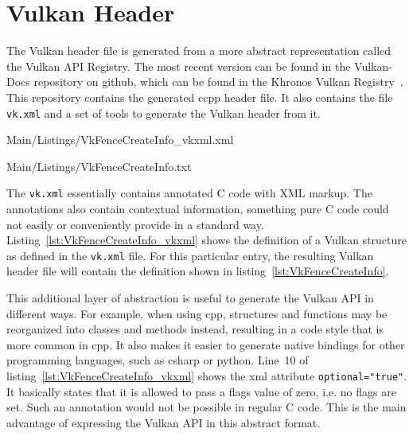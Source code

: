   \section{Vulkan Header}
  \label{sec:VulkanHeader}
    The Vulkan header file is generated from a more abstract representation called the Vulkan API Registry.
    The most recent version can be found in the Vulkan-Docs repository on \gls{github}, which can be found in the Khronos Vulkan Registry~\cite{vulkanregistry}.
    This repository contains the generated \gls{ccpp} header file.
    It also contains the file \lstinline{vk.xml} and a set of tools to generate the Vulkan header from it.

    
    {Main/Listings/VkFenceCreateInfo_vkxml.xml}
    
    {Main/Listings/VkFenceCreateInfo.txt}

    The \lstinline{vk.xml} essentially contains annotated C code with XML markup.
    The annotations also contain contextual information, something pure C code could not easily or conveniently provide in a standard way.
    Listing~\ref{lst:VkFenceCreateInfo_vkxml} shows the definition of a Vulkan structure as defined in the \lstinline{vk.xml} file.
    For this particular entry, the resulting Vulkan header file will contain the definition shown in listing~\ref{lst:VkFenceCreateInfo}.

    This additional layer of abstraction is useful to generate the Vulkan API in different ways.
    For example, when using \gls{cpp}, structures and functions may be reorganized into classes and methods instead, resulting in a code style that is more common in \gls{cpp}.
    It also makes it easier to generate native bindings for other programming languages, such as \gls{csharp} or \gls{python}.
    Line~10 of listing~\ref{lst:VkFenceCreateInfo_vkxml} shows the xml attribute \lstinline{optional="true"}.
    It basically states that it is allowed to pass a flags value of zero, i.e. no flags are set.
    Such an annotation would not be possible in regular C code.
    This is the main advantage of expressing the Vulkan API in this abstract format.


